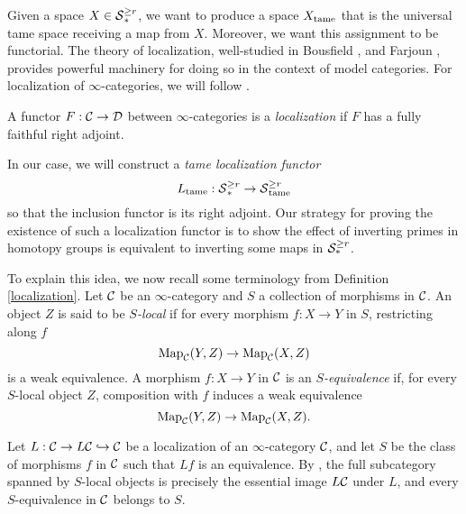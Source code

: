     
Given a space $X\in \operatorname{\mathcal{S}}^{\geq r}_{*}$, we want to produce a space $X_{\operatorname{\operatorname{tame}}}$ that is the universal tame space receiving a map from $X$. Moreover, we want this assignment to be functorial. The theory of localization, well-studied in Bousfield \cite{BousfieldSpaces}, \cite{BousfieldSpectra} and Farjoun \cite{Farjoun}, provides powerful machinery for doing so in the context of model categories.
For localization of $\infty$-categories, we will follow \cite{HTT}.
\begin{definition}
    \cite[Definition 5.2.7.2.]{HTT}
    A functor $F:{\mathcal{C}}\to {\mathcal{D}}$ between $\infty$-categories is a \emph{localization} if $F$ has a fully faithful right adjoint.
\end{definition}
In our case, we will construct a \emph{tame localization functor}
$$
L_{\operatorname{\operatorname{tame}}}: \operatorname{\mathcal{S}}^{\geq r}_* \to \operatorname{\mathcal{S}}^{\geq r}_{\operatorname{\operatorname{tame}}}
$$
so that the inclusion functor is its right adjoint.
Our strategy for proving the existence of such a localization functor is to show the effect of inverting primes in homotopy groups is equivalent to inverting some maps in ${\mathcal{S}}^{\geq r}_{*}$.

To explain this idea, we now recall some terminology from Definition \ref{localization}. 
Let ${\mathcal{C}}$ be an $\infty$-category and $S$ a collection of morphisms in ${\mathcal{C}}$.
An object $Z$ is said to be \emph{$S$-local} if for every morphism $f:X\to Y$ in $S$, restricting along $f$ 
$$
\operatorname{Map}_{{\mathcal{C}}}(Y,Z) \to \operatorname{Map}_{{\mathcal{C}}}(X,Z)
$$
is a weak equivalence.
A morphism $f:X\to Y$ in ${\mathcal{C}}$ is an \emph{$S$-equivalence} if, for every $S$-local object $Z$, composition with $f$ induces a weak equivalence 
$$
\operatorname{Map}_{{\mathcal{C}}}(Y,Z) \to \operatorname{Map}_{{\mathcal{C}}}(X,Z).
$$
\begin{remark}
    Let $L:{\mathcal{C}} \to L{\mathcal{C}} \hookrightarrow {\mathcal{C}}$ be a localization of an $\infty$-category ${\mathcal{C}}$, and let $S$ be the class of morphisms $f$ in ${\mathcal{C}}$ such that $Lf$ is an equivalence.
    By \cite[Proposition 5.5.4.2.]{HTT}, the full subcategory spanned by $S$-local objects is precisely the essential image $L{\mathcal{C}}$ under $L$, and every $S$-equivalence in ${\mathcal{C}}$ belongs to $S$. 
\end{remark}

